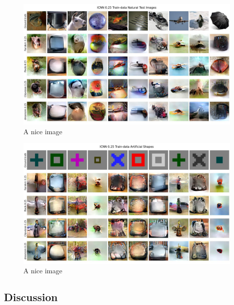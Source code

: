 \begin{figure}[ht]
  \centering
  \includegraphics[width=1\textwidth]{plots/dropout_qual_eval_icnn_test.JPEG}
  \caption{A nice image}\label{fig:dropout_qual_eval_icnn_test}
\end{figure}

\begin{figure}[ht]
  \centering
  \includegraphics[width=1\textwidth]{plots/dropout_qual_eval_icnn_art.JPEG}
  \caption{A nice image}\label{fig:dropout_qual_eval_icnn_art}
\end{figure}



\subsection{Discussion}

